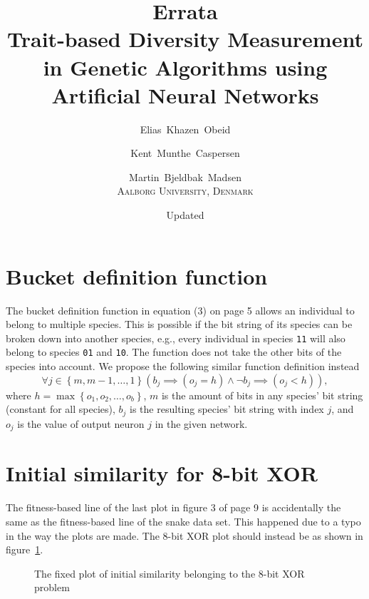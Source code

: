 \documentclass{memoir}
\title{Errata\\
\Large Trait-based Diversity Measurement in Genetic Algorithms using Artificial Neural Networks}
\author{Elias~Khazen~Obeid \and
        Kent~Munthe~Caspersen \and
      Martin~Bjeldbak~Madsen\\
    \scshape Aalborg University, Denmark}
\date{Updated \formatdate{20}{6}{2014}}
\begin{document}
\pagestyle{empty}
\maketitle
\thispagestyle{empty}

\section*{Bucket definition function}
The bucket definition function in equation (3) on page 5 allows an individual to belong to multiple species. This is possible if the bit string of its species can be broken down into another species, e.g., every individual in species \texttt{11} will also belong to species \texttt{01} and \texttt{10}. The function does not take the other bits of the species into account. We propose the following similar function definition instead
\begin{equation*}
  \forall j \in \left\{m, m-1,\dots,1\right\}\left(b_j \implies \left(o_j = h\right) \land \neg b_j \implies\left(o_j < h\right)\right),
\end{equation*}
where $h = \max\left\{o_1, o_2, \dots, o_b\right\}$, $m$ is the amount of bits in any species' bit string (constant for all species), $b_j$ is the resulting species' bit string with index $j$, and $o_j$ is the value of output neuron $j$ in the given network.

\section*{Initial similarity for 8-bit XOR}
The fitness-based line of the last plot in figure 3 of page 9 is accidentally the same as the fitness-based line of the snake data set. This happened due to a typo in the way the plots are made. The 8-bit XOR plot should instead be as shown in figure~\ref{fig:initial-similarity-xor}.

\begin{figure}[htbp]
  \centering
  \resizebox{0.5\linewidth}{!}{%
  
}
  \caption{The fixed plot of initial similarity belonging to the 8-bit XOR problem}\label{fig:initial-similarity-xor}
\end{figure}
\end{document}
